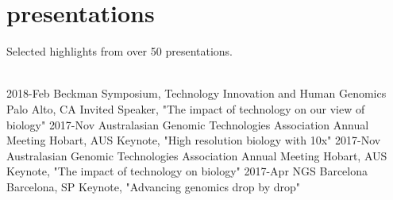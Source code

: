 \documentclass[]{dmc-cv} %
\begin{document}
\section{presentations}
Selected highlights from over 50 presentations.\\
\\
\begin{entrylist}
\entry
{2018-Feb}
{Beckman Symposium, Technology Innovation and Human Genomics}
{Palo Alto, CA}
{Invited Speaker, "The impact of technology on our view of biology"}
\entry
{2017-Nov}
{Australasian Genomic Technologies Association Annual Meeting}
{Hobart, AUS}
{Keynote, "High resolution biology with 10x"}
\entry
{2017-Nov}
{Australasian Genomic Technologies Association Annual Meeting}
{Hobart, AUS}
{Keynote, "The impact of technology on biology"}
\entry
{2017-Apr}
{NGS Barcelona}
{Barcelona, SP}
{Keynote, "Advancing genomics drop by drop"}


\end{entrylist}
\end{document}

